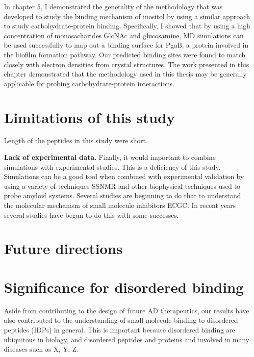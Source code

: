 In chapter 5, I demonstrated the generality of the methodology that was developed to study the binding mechanism of inositol by using a similar approach to study carbohydrate-protein binding. Specifically, I showed that by using a high concentration of monosacharides GlcNAc and glucosamine, MD simulations can be used successfully to map out a binding surface for PgaB, a protein involved in the biofilm formation pathway.  Our predicted binding sites were found to match closely with electron densities from crystal structures.  The work presented in this chapter demonstrated that the methodology used in this thesis may be generally applicable for probing carbohydrate-protein interactions.

\section{Limitations of this study}

Length of the peptides in this study were short.

\textbf{Lack of experimental data.} Finally, it would important to combine simulations with experimental studies.  This is a deficiency of this study. Simulations can be a good tool when combined with experimental validation by using a variety of techniques SSNMR and other biophysical techniques used to probe amyloid systems. Several studies are beginning to do that to understand the molecular mechanism of small molecule inhibitors ECGC.  In recent years several studies have begun to do this with some successes.

\section{Future directions}
\section{Significance for disordered binding}
Aside from contributing to the design of future AD therapeutics, our results have also contributed to the understanding of small molecule binding to disordered peptides (IDPs) in general. This is important because disordered binding are ubiquitous in biology, and disordered peptides and proteins and involved in many diseases such as X, Y, Z.  

